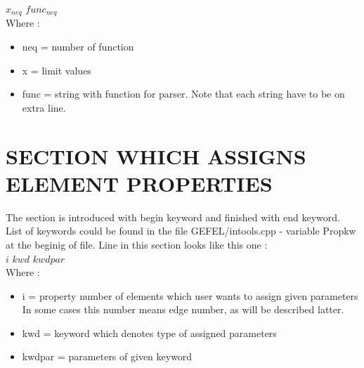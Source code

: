 \documentclass[12pt]{book}
\begin{document}
\begin{itemize}
\begin{itemize}
\begin{itemize}
                         $x_{neq}$ $func_{neq}$\\
               Where :
                 \begin{itemize}
                 \item neq = number of function
                 \item x   = limit values
                 \item func = string with function for parser. Note that each string
                        have to be on extra line.
                 \end{itemize}
               \end{itemize} %
           \end{itemize} %
\end{itemize} %


\section {SECTION WHICH ASSIGNS ELEMENT PROPERTIES}
The section is introduced with begin keyword and finished with end keyword.
List of keywords could be found in the file GEFEL/intools.cpp - variable Propkw
at the beginig of file. Line in this section looks like this one :\\

$i$ $kwd$ $kwdpar$\\

Where :\\
\begin{itemize}
\item i = property number of elements which user wants to assign given parameters
          In some cases this number means edge number, as will be described latter.
\item kwd    = keyword which denotes type of assigned parameters
\item kwdpar = parameters of given keyword\\ \\
\end{itemize}
\end{document}
